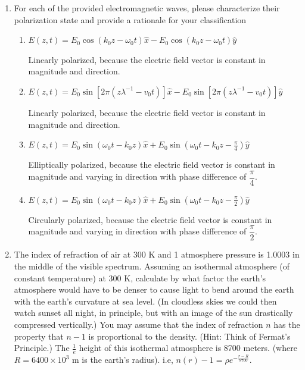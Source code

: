 \documentclass{zc-ust-hw}
\begin{document}
\begin{enumerate}
  \item For each of the provided electromagnetic waves, please characterize
    their polarization state and provide a rationale for your classification
    \begin{enumerate}
      \item $E(z,t) = E_0\cos(k_0z-\omega_0t) \hat{x}-E_0\cos(k_0z-\omega_0t) \hat{y}$ 
        \begin{sol}
          Linearly polarized, because the electric field vector is constant in
          magnitude and direction.
        \end{sol}
      \item $E(z,t) = E_0\sin[2\pi(z\lambda^{-1}-v_0t)]\hat{x}-E_0\sin[2\pi(z\lambda^{-1}-v_0t)]\hat{y}$
        \begin{sol}
          Linearly polarized, because the electric field vector is constant in
          magnitude and direction.
        \end{sol}
      \item $E(z,t) = E_0\sin(\omega_0t-k_0z)\hat{x}+E_0\sin(\omega_0t-k_0z-\frac{\pi}{4})\hat{y}$
        \begin{sol}
          Elliptically polarized, because the electric field vector is constant
          in magnitude and varying in direction with phase difference of $\dfrac{\pi}{4}$.
        \end{sol}
      \item $E(z,t) = E_0\sin(\omega_0t-k_0z)\hat{x}+E_0\sin(\omega_0t-k_0z-\frac{\pi}{2})\hat{y}$
        \begin{sol}
          Circularly polarized, because the electric field vector is constant
          in magnitude and varying in direction with phase difference of $\dfrac{\pi}{2}$.
        \end{sol}
    \end{enumerate}

    \newpage

  \item The index of refraction of air at 300 K and 1 atmosphere pressure is
    1.0003 in the middle of the visible spectrum. Assuming an isothermal
    atmosphere (of constant temperature) at 300 K, calculate by what factor the
    earth’s atmosphere would have to be denser to cause light to bend around
    the earth with the earth’s curvature at sea level. (In cloudless skies we
    could then watch sunset all night, in principle, but with an image of the
    sun drastically compressed vertically.) You may assume that the index of
    refraction $n$ has the property that $n - 1$ is proportional to the
    density. (Hint: Think of Fermat's Principle.) The $\frac{1}{e}$ height of
    this isothermal atmosphere is 8700 meters. (where $R = 6400 \times  10^3$ m
    is the earth's radius). i.e, $n(r)-1 = \rho e^{-\frac{r-R}{8700}}$.


\end{enumerate}
\end{document}

